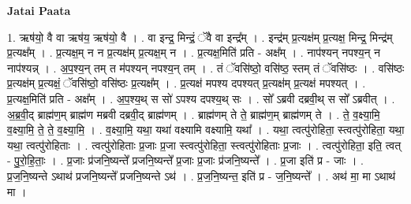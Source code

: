 \documentclass[17pt]{extarticle}
\begin{document}
\textbf{Jatai Paata} \newline

1. ऋष॑यो॒ वै वा ऋष॑य॒ ऋष॑यो॒ वै । . वा इन्द्र॒ मिन्द्रं॒ ॅवै वा इन्द्र᳚म् । . इन्द्र॑म् प्र॒त्यक्ष॑म् प्र॒त्यक्ष॒ मिन्द्र॒ मिन्द्र॑म् प्र॒त्यक्ष᳚म् । . प्र॒त्यक्ष॒म् न न प्र॒त्यक्ष॑म् प्र॒त्यक्ष॒म् न । . प्र॒त्यक्ष॒मिति॑ प्रति - अक्ष᳚म् । . नाप॑श्यन् नपश्य॒न् न नाप॑श्यन्न् । . अ॒प॒श्य॒न् तम् त म॑पश्यन् नपश्य॒न् तम् । . तं ॅवसि॑ष्ठो॒ वसि॑ष्ठ॒ स्तम् तं ॅवसि॑ष्ठः । . वसि॑ष्ठः प्र॒त्यक्ष॑म् प्र॒त्यक्षं॒ ॅवसि॑ष्ठो॒ वसि॑ष्ठः प्र॒त्यक्ष᳚म् । . प्र॒त्यक्ष॑ मपश्य दपश्यत् प्र॒त्यक्ष॑म् प्र॒त्यक्ष॑ मपश्यत् । . प्र॒त्यक्ष॒मिति॑ प्रति - अक्ष᳚म् । . अ॒प॒श्य॒थ् स सो॑ ऽपश्य दपश्य॒थ् सः । . सो᳚ ऽब्रवी दब्रवी॒थ् स सो᳚ ऽब्रवीत् । . अ॒ब्र॒वी॒द् ब्राह्म॑ण॒म् ब्राह्म॑ण मब्रवी दब्रवी॒द् ब्राह्म॑णम् । . ब्राह्म॑णम् ते ते॒ ब्राह्म॑ण॒म् ब्राह्म॑णम् ते । . ते॒ व॒क्ष्या॒मि॒ व॒क्ष्या॒मि॒ ते॒ ते॒ व॒क्ष्या॒मि॒ । . व॒क्ष्या॒मि॒ यथा॒ यथा॑ वक्ष्यामि वक्ष्यामि॒ यथा᳚ । . यथा॒ त्वत्पु॑रोहिता॒ स्त्वत्पु॑रोहिता॒ यथा॒ यथा॒ त्वत्पु॑रोहिताः । . त्वत्पु॑रोहिताः प्र॒जाः प्र॒जा स्त्वत्पु॑रोहिता॒ स्त्वत्पु॑रोहिताः प्र॒जाः । . त्वत्पु॑रोहिता॒ इति॒ त्वत् - पु॒रो॒हि॒ताः॒ । . प्र॒जाः प्र॑जनि॒ष्यन्ते᳚ प्रजनि॒ष्यन्ते᳚ प्र॒जाः प्र॒जाः प्र॑जनि॒ष्यन्ते᳚ । . प्र॒जा इति॑ प्र - जाः । . प्र॒ज॒नि॒ष्यन्ते ऽथाथ॑ प्रजनि॒ष्यन्ते᳚ प्रजनि॒ष्यन्ते ऽथ॑ । . प्र॒ज॒नि॒ष्यन्त॒ इति॑ प्र - ज॒नि॒ष्यन्ते᳚ । . अथ॑ मा॒ मा ऽथाथ॑ मा । \newline
\end{document}
